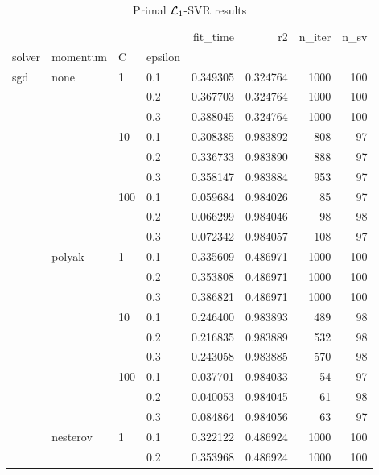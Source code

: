 \begin{table}[H]
\centering
\caption{Primal $\protect \mathcal{L}_1$-SVR results}
\label{primal_l1_svr_cv_results}
\begin{tabular}{llllrrrr}
\toprule
          &   &     &     &  fit\_time &        r2 &  n\_iter &  n\_sv \\
solver & momentum & C & epsilon &           &           &         &       \\
\midrule
sgd & none & 1   & 0.1 &  0.349305 &  0.324764 &    1000 &   100 \\
          &   &     & 0.2 &  0.367703 &  0.324764 &    1000 &   100 \\
          &   &     & 0.3 &  0.388045 &  0.324764 &    1000 &   100 \\
          &   & 10  & 0.1 &  0.308385 &  0.983892 &     808 &    97 \\
          &   &     & 0.2 &  0.336733 &  0.983890 &     888 &    97 \\
          &   &     & 0.3 &  0.358147 &  0.983884 &     953 &    97 \\
          &   & 100 & 0.1 &  0.059684 &  0.984026 &      85 &    97 \\
          &   &     & 0.2 &  0.066299 &  0.984046 &      98 &    98 \\
          &   &     & 0.3 &  0.072342 &  0.984057 &     108 &    97 \\
          & polyak & 1   & 0.1 &  0.335609 &  0.486971 &    1000 &   100 \\
          &   &     & 0.2 &  0.353808 &  0.486971 &    1000 &   100 \\
          &   &     & 0.3 &  0.386821 &  0.486971 &    1000 &   100 \\
          &   & 10  & 0.1 &  0.246400 &  0.983893 &     489 &    98 \\
          &   &     & 0.2 &  0.216835 &  0.983889 &     532 &    98 \\
          &   &     & 0.3 &  0.243058 &  0.983885 &     570 &    98 \\
          &   & 100 & 0.1 &  0.037701 &  0.984033 &      54 &    97 \\
          &   &     & 0.2 &  0.040053 &  0.984045 &      61 &    98 \\
          &   &     & 0.3 &  0.084864 &  0.984056 &      63 &    97 \\
          & nesterov & 1   & 0.1 &  0.322122 &  0.486924 &    1000 &   100 \\
          &   &     & 0.2 &  0.353968 &  0.486924 &    1000 &   100 \\

\end{tabular}
\end{table}
